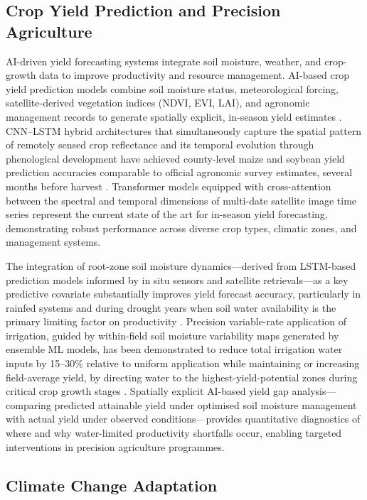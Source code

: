 \documentclass[land,article,submit,pdftex,moreauthors]{Definitions/mdpi}
\numberwithin{equation}{section}
\begin{document}
\subsection{Crop Yield Prediction and Precision Agriculture}

AI-driven yield forecasting systems integrate soil moisture, weather, and crop-growth data to improve productivity and resource management. AI-based crop yield prediction models combine soil moisture status, meteorological forcing, satellite-derived vegetation indices (NDVI, EVI, LAI), and agronomic management records to generate spatially explicit, in-season yield estimates \citep{you2017deep}. CNN--LSTM hybrid architectures that simultaneously capture the spatial pattern of remotely sensed crop reflectance and its temporal evolution through phenological development have achieved county-level maize and soybean yield prediction accuracies comparable to official agronomic survey estimates, several months before harvest \textcolor{blue}{\citep{you2017deep, Kratzert2018}}. Transformer models equipped with cross-attention between the spectral and temporal dimensions of multi-date satellite image time series represent the current state of the art for in-season yield forecasting, demonstrating robust performance across diverse crop types, climatic zones, and management systems.

The integration of root-zone soil moisture dynamics---derived from LSTM-based prediction models informed by in situ sensors and satellite retrievals---as a key predictive covariate substantially improves yield forecast accuracy, particularly in rainfed systems and during drought years when soil water availability is the primary limiting factor on productivity \textcolor{blue}{\citep{Fang2017, fang2019deep}}. Precision variable-rate application of irrigation, guided by within-field soil moisture variability maps generated by ensemble ML models, has been demonstrated to reduce total irrigation water inputs by 15--30\% relative to uniform application while maintaining or increasing field-average yield, by directing water to the highest-yield-potential zones during critical crop growth stages \citep{vij2020iot}. Spatially explicit AI-based yield gap analysis---comparing predicted attainable yield under optimised soil moisture management with actual yield under observed conditions---provides quantitative diagnostics of where and why water-limited productivity shortfalls occur, enabling targeted interventions in precision agriculture programmes.

\subsection{Climate Change Adaptation}
\end{document}
